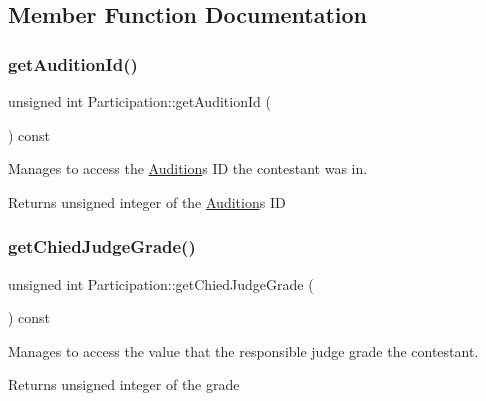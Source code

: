 \subsection{Member Function Documentation}
\mbox{\label{class_participation_aede9a8356da23d9ee7f4c9c422a05945}} 
\subsubsection{\texorpdfstring{get\+Audition\+Id()}{getAuditionId()}}
{\footnotesize\ttfamily unsigned int Participation\+::get\+Audition\+Id (\begin{DoxyParamCaption}{ }\end{DoxyParamCaption}) const}



Manages to access the \hyperlink{class_audition}{Audition}\textquotesingle{}s ID the contestant was in. 

\begin{DoxyReturn}{Returns}
unsigned integer of the \hyperlink{class_audition}{Audition}\textquotesingle{}s ID 
\end{DoxyReturn}
\mbox{\label{class_participation_ad13c6d16677eefc0fb304b074bff97f6}} 
\subsubsection{\texorpdfstring{get\+Chied\+Judge\+Grade()}{getChiedJudgeGrade()}}
{\footnotesize\ttfamily unsigned int Participation\+::get\+Chied\+Judge\+Grade (\begin{DoxyParamCaption}{ }\end{DoxyParamCaption}) const}



Manages to access the value that the responsible judge grade the contestant. 

\begin{DoxyReturn}{Returns}
unsigned integer of the grade 
\end{DoxyReturn}
\mbox{\label{class_participation_a67add733b1f6fe05b47ebd883486cb3c}} 
